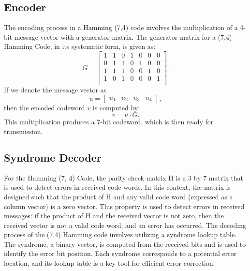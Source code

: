 \documentclass{article}
\begin{document}
\subsection{Encoder}
The encoding process in a Hamming (7,4) code involves the multiplication of a 4-bit message vector with a generator matrix. The generator matrix for a (7,4) Hamming Code, in its systematic form, is given as:
\begin{equation*}
    G = 
        \begin{bmatrix}
        1 & 1 & 0 & 1 & 0 & 0 & 0 \\
        0 & 1 & 1 & 0 & 1 & 0 & 0 \\
        1 & 1 & 1 & 0 & 0 & 1 & 0 \\
        1 & 0 & 1 & 0 & 0 & 0 & 1 \\
        \end{bmatrix}.
\end{equation*}
If we denote the message vector as 
\begin{equation*}
    u =
        \begin{bmatrix}
        u_1 & u_2 & u_3 & u_4 
        \end{bmatrix},
\end{equation*}
then the encoded codeword $v$ is computed by:
\begin{equation*}
    v = u \cdot G .
\end{equation*}
This multiplication produces a 7-bit codeword, which is then ready for transmission.





\subsection{Syndrome Decoder}
For the Hamming (7, 4) Code, the parity check matrix H is a 3 by 7 matrix that is used to detect errors in received code words. In this context, the matrix is designed such that the product of H and any valid code word (expressed as a column vector) is a zero vector. This property is used to detect errors in received messages: if the product of H and the received vector is not zero, then the received vector is not a valid code word, and an error has occurred.
The decoding process of the (7,4) Hamming code involves utilizing a syndrome lookup table. The syndrome, a binary vector, is computed from the received bits and is used to identify the error bit position. Each syndrome corresponds to a potential error location, and its lookup table is a key tool for efficient error correction.
\end{document}
